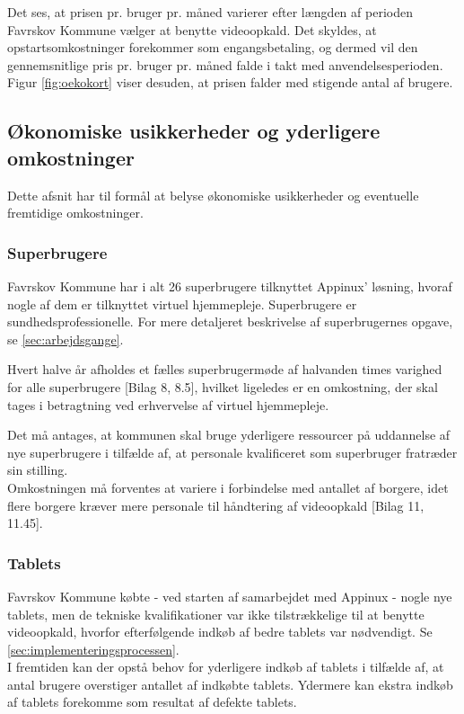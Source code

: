 Det ses, at prisen pr. bruger pr. måned varierer efter længden af perioden Favrskov Kommune vælger at benytte videoopkald.
Det skyldes, at opstartsomkostninger forekommer som engangsbetaling, og dermed vil den gennemsnitlige pris pr. bruger pr. måned falde i takt med anvendelsesperioden. Figur \ref{fig:oekokort} viser desuden, at prisen falder med stigende antal af brugere.  

\subsection{Økonomiske usikkerheder og yderligere omkostninger}
Dette afsnit har til formål at belyse økonomiske usikkerheder og eventuelle fremtidige omkostninger. 

\subsubsection{Superbrugere}
Favrskov Kommune har i alt 26 superbrugere tilknyttet Appinux’ løsning, hvoraf nogle af dem er tilknyttet virtuel hjemmepleje. Superbrugere er sundhedsprofessionelle. For mere detaljeret beskrivelse af superbrugernes opgave, se \vref{sec:arbejdsgange}.   

Hvert halve år afholdes et fælles superbrugermøde af halvanden times varighed for alle superbrugere [Bilag 8, 8.5], hvilket ligeledes er en omkostning, der skal tages i betragtning ved erhvervelse af virtuel hjemmepleje. 

Det må antages, at kommunen skal bruge yderligere ressourcer på uddannelse af nye superbrugere i tilfælde af, at personale kvalificeret som superbruger fratræder sin stilling. \\
Omkostningen må forventes at variere i forbindelse med antallet af borgere, idet flere borgere kræver mere personale til håndtering af videoopkald [Bilag 11, 11.45].

\subsubsection{Tablets}
Favrskov Kommune købte - ved starten af samarbejdet med Appinux - nogle nye tablets, men de tekniske kvalifikationer var ikke tilstrækkelige til at benytte videoopkald, hvorfor efterfølgende indkøb af bedre tablets var nødvendigt. Se \vref{sec:implementeringsprocessen}.  \\
I fremtiden kan der opstå behov for yderligere indkøb af tablets i tilfælde af, at antal brugere overstiger antallet af indkøbte tablets. Ydermere kan ekstra indkøb af tablets forekomme som resultat af defekte tablets.


